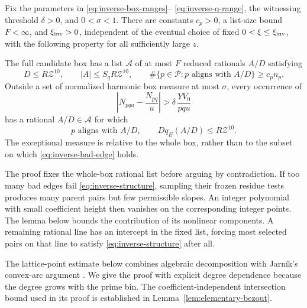 \begin{proposition}
\label{prop:inverse}
Fix the parameters in \eqref{eq:inverse-box-ranges}--%
\eqref{eq:inverse-q-range}, the witnessing threshold \(\delta>0\), and
\(0<\sigma<1\).
There are constants \(c_p>0\), a list-size bound \(F<\infty\), and
\(\xi_{\rm inv}>0\), independent of the eventual choice of fixed
\(0<\xi\le\xi_{\rm inv}\), with the following property for all
sufficiently large \(z\).

The full candidate box has a list \(\mathcal A\) of at most \(F\)
reduced rationals \(A/D\) satisfying
\begin{equation}
 D\le R\mathcal Z^{10},\qquad
 |A|\le S_qR\mathcal Z^{10},\qquad
 \#\{p\in\mathcal P:p\text{ aligns with }A/D\}\ge c_p n_p .
 \label{eq:inverse-list}
\end{equation}
Outside a set of normalized harmonic box measure at most \(\sigma\),
every occurrence of
\begin{equation}
 \left|N_{pqu}-\frac{N_{pq}}u\right|
       >\delta\,\frac{YV_0}{pqu}
 \label{eq:inverse-bad-edge}
\end{equation}
has a rational \(A/D\in\mathcal A\) for which
\begin{equation}
 p\text{ aligns with }A/D,
 \qquad D q_E(A/D)\le R\mathcal Z^{10}.
 \label{eq:inverse-structure}
\end{equation}
The exceptional measure is relative to the whole box, rather than to
the subset on which \eqref{eq:inverse-bad-edge} holds.
\end{proposition}

The proof fixes the whole-box rational list before arguing by
contradiction. If too many bad edges fail \eqref{eq:inverse-structure},
sampling their frozen residue tests produces many parent pairs but few
permissible slopes. An integer polynomial with small coefficient height
then vanishes on the corresponding integer points. The lemma below bounds
the contribution of its nonlinear components. A remaining rational line
has an intercept in the fixed list, forcing most selected pairs on that
line to satisfy \eqref{eq:inverse-structure} after all.

The lattice-point estimate below combines algebraic decomposition with
Jarn\'{i}k's convex-arc argument \cite[Sections~1--2]{Jarnik1926}.
We give the proof with explicit degree dependence because the degree
grows with the prime bin. The coefficient-independent intersection
bound used in its proof is established in
Lemma~\ref{lem:elementary-bezout}.

